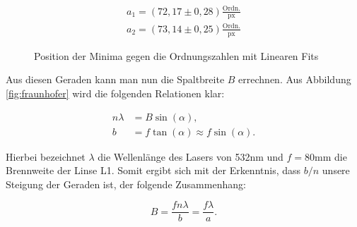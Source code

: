 \documentclass{article}
\begin{document}
\begin{equation}
    \begin{split}
        a_1 = (72,17 \pm 0,28) \frac{\text{Ordn.}}{\text{px}} \\
        a_2 = (73,14 \pm 0,25) \frac{\text{Ordn.}}{\text{px}}
    \end{split}
\end{equation}

\begin{figure}[!b]
    \centering
    \caption{Position der Minima gegen die Ordnungszahlen mit Linearen Fits}
    \label{fig:Pos-Ordn_Min}
\end{figure}

\newpage
Aus diesen Geraden kann man nun die Spaltbreite $B$ errechnen. Aus Abbildung \ref{fig:fraunhofer} wird die folgenden Relationen klar:

\begin{equation}
    \begin{split}
        n \lambda &= B \sin{(\alpha)}, \\
        b &= f \tan (\alpha) \approx f \sin{(\alpha)}.
    \end{split}
\end{equation}

Hierbei bezeichnet $\lambda$ die Wellenlänge des Lasers von 532nm und $f=80$mm die Brennweite der Linse L1. Somit ergibt sich mit der Erkenntnis, dass $b/n$ unsere Steigung der Geraden ist, der folgende Zusammenhang:

\begin{equation}
    B = \frac{f n \lambda}{b} = \frac{f \lambda}{a}.
\end{equation}
\end{document}
